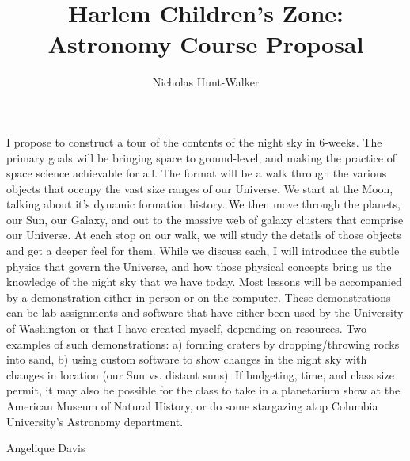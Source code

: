 \documentclass[12pt]{article}
\begin{document}
\title{Harlem Children's Zone: Astronomy Course Proposal}
\author{Nicholas Hunt-Walker}
\maketitle

I propose to construct a tour of the contents of the night sky in 6-weeks. The primary goals will be bringing space to ground-level, and making the practice of space science achievable for all. The format will be a walk through the various objects that occupy the vast size ranges of our Universe. We start at the Moon, talking about it's dynamic formation history. We then move through the planets, our Sun, our Galaxy, and out to the massive web of galaxy clusters that comprise our Universe. At each stop on our walk, we will study the details of those objects and get a deeper feel for them. While we discuss each, I will introduce the subtle physics that govern the Universe, and how those physical concepts bring us the knowledge of the night sky that we have today. Most lessons will be accompanied by a demonstration either in person or on the computer. These demonstrations can be lab assignments and software that have either been used by the University of Washington or that I have created myself, depending on resources.  Two examples of such demonstrations: a) forming craters by dropping/throwing rocks into sand, b) using custom software to show changes in the night sky with changes in location (our Sun vs. distant suns).  If budgeting, time, and class size permit, it may also be possible for the class to take in a planetarium show at the American Museum of Natural History, or do some stargazing atop Columbia University's Astronomy department.


Angelique Davis
\end{document}
